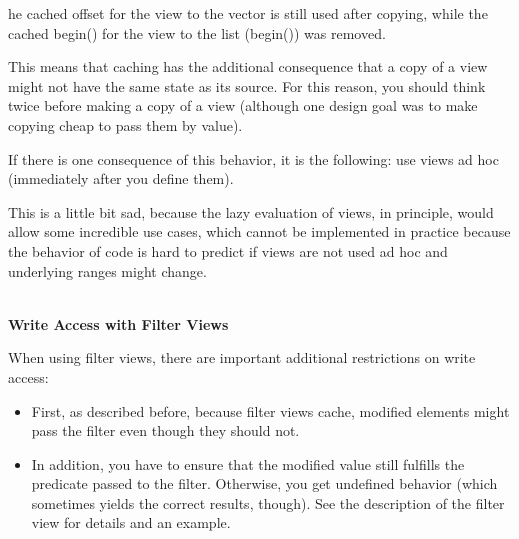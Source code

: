 he cached offset for the view to the vector is still used after copying, while the cached begin() for the view to the list (begin()) was removed.

This means that caching has the additional consequence that a copy of a view might not have the same state as its source. For this reason, you should think twice before making a copy of a view (although one design goal was to make copying cheap to pass them by value).

If there is one consequence of this behavior, it is the following: use views ad hoc (immediately after you define them).

This is a little bit sad, because the lazy evaluation of views, in principle, would allow some incredible use cases, which cannot be implemented in practice because the behavior of code is hard to predict if views are not used ad hoc and underlying ranges might change.

\noindent
\hspace*{\fill} \\ %
\textbf{Write Access with Filter Views}

When using filter views, there are important additional restrictions on write access:

\begin{itemize}
\item
First, as described before, because filter views cache, modified elements might pass the filter even though they should not.

\item
In addition, you have to ensure that the modified value still fulfills the predicate passed to the filter. Otherwise, you get undefined behavior (which sometimes yields the correct results, though). See the description of the filter view for details and an example.
\end{itemize}

